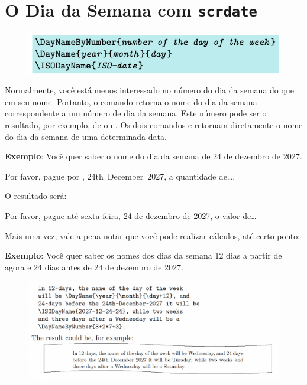 \chapter{O Dia da Semana com \texttt{scrdate}}
\begin{figure}[h]
    \centering
    \includegraphics[width=0.75\linewidth]{imagem10.png}
\end{figure}

Normalmente, você está menos interessado no número do dia da semana do que em seu nome. Portanto, o comando  retorna o nome do dia da semana correspondente a um número de dia da semana. Este número pode ser o resultado, por exemplo, de  ou . Os dois comandos  e  retornam diretamente o nome do dia da semana de uma determinada data.

\bigskip
\textbf{Exemplo}: Você quer saber o nome do dia da semana de 24 de dezembro de 2027.

Por favor, pague por , 24th~December~2027, a quantidade de\dots.  
\medskip

O resultado será:

Por favor, pague até sexta-feira, 24 de dezembro de 2027, o valor de\ldots

\medskip
Mais uma vez, vale a pena notar que você pode realizar cálculos, até certo ponto:

\bigskip
\textbf{Exemplo}: Você quer saber os nomes dos dias da semana 12 dias a partir de agora e 24 dias antes de 24 de dezembro de 2027.

\begin{figure}[h]
    \centering
    \includegraphics[width=0.9\linewidth]{imagem11.png}
\end{figure}

